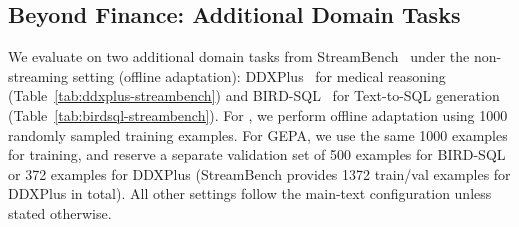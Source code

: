 \begin{table}[t!]
  \centering
  \caption{\textbf{Results on Financial Analysis Benchmark (Llama-3.3-70B-Instruct as the Base LLM).} ``GT labels" indicates whether ground-truth labels are available to the Reflector during adaptation.}
  \label{tab:ds-results-llama70b}
\end{table}

\subsection{Beyond Finance: Additional Domain Tasks}
\label{subsec:streambench-results}

We evaluate \name on two additional domain tasks from StreamBench~\citep{wu2024streambench} under the non-streaming setting (\ie offline adaptation): DDXPlus~\citep{fansi2022ddxplus} for medical reasoning (Table~\ref{tab:ddxplus-streambench}) and BIRD-SQL~\citep{li2023can} for Text-to-SQL generation (Table~\ref{tab:birdsql-streambench}).
For \name, we perform offline adaptation using 1000 randomly sampled training examples.
For GEPA, we use the same 1000 examples for training, and reserve a separate validation set of 500 examples for BIRD-SQL or 372 examples for DDXPlus (StreamBench provides 1372 train/val examples for DDXPlus in total).
All other settings follow the main-text configuration unless stated otherwise.

